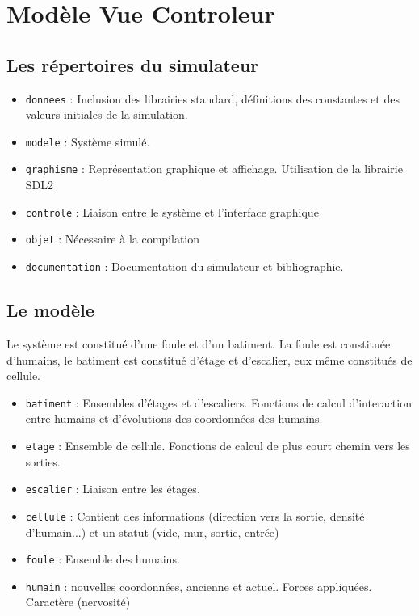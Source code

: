 %
\section{Modèle Vue Controleur}
%
%
\subsection{Les répertoires du simulateur}
\begin{itemize}[leftmargin=2cm]
\item \texttt{donnees} : Inclusion des librairies standard, définitions des constantes et des valeurs initiales de la simulation.
\item \texttt{modele} : Système simulé. 
\item \texttt{graphisme} : Représentation graphique et affichage. Utilisation de la librairie SDL2
\item \texttt{controle} : Liaison entre le système et l'interface graphique 
\item \texttt{objet} : Nécessaire à la compilation
\item \texttt{documentation} : Documentation du simulateur et bibliographie.
\end{itemize}
%
\subsection{Le modèle}
Le système est constitué d'une foule et d'un batiment. La foule est constituée d'humains, le batiment est constitué d'étage et d'escalier, eux même constitués de cellule.
\begin{itemize}[leftmargin=2cm]
\item \texttt{batiment} : Ensembles d'étages et d'escaliers. Fonctions de calcul d'interaction entre humains et d'évolutions des coordonnées des humains.
\item \texttt{etage} : Ensemble de cellule. Fonctions de calcul de plus court chemin vers les sorties.
\item \texttt{escalier} : Liaison entre les étages. 
\item \texttt{cellule} : Contient des informations (direction vers la sortie, densité d'humain...) et un statut (vide, mur, sortie, entrée)
\item \texttt{foule} : Ensemble des humains.
\item \texttt{humain} : nouvelles coordonnées, ancienne et actuel. Forces appliquées. Caractère (nervosité)
\end{itemize}
%

